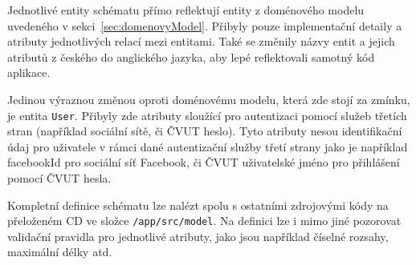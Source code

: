 Jednotlivé entity schématu přímo reflektují entity z doménového modelu uvedeného v sekci~\ref{sec:domenovyModel}.
Přibyly pouze implementační detaily a atributy jednotlivých relací mezi entitami.
Také se změnily názvy entit a jejich atributů z českého do anglického jazyka, aby lepé reflektovali samotný kód aplikace.

Jedinou výraznou změnou oproti doménovému modelu, která zde stojí za zmínku, je entita \texttt{User}.
Přibyly zde atributy sloužící pro autentizaci pomocí služeb třetích stran (například sociální sítě, či \acrshort{ČVUT} heslo).
Tyto atributy nesou identifikační údaj pro uživatele v rámci dané autentizační služby třetí strany jako je například facebookId pro sociální síť Facebook, či \acrshort{ČVUT} uživatelské jméno pro přihlášení pomocí \acrshort{ČVUT} hesla.

Kompletní definice schématu lze nalézt spolu s ostatními zdrojovými kódy na přeloženém CD ve složce \texttt{/app/src/model}.
Na definici lze i mimo jiné pozorovat validační pravidla pro jednotlivé atributy, jako jsou například číselné rozsahy, maximální délky atd.
